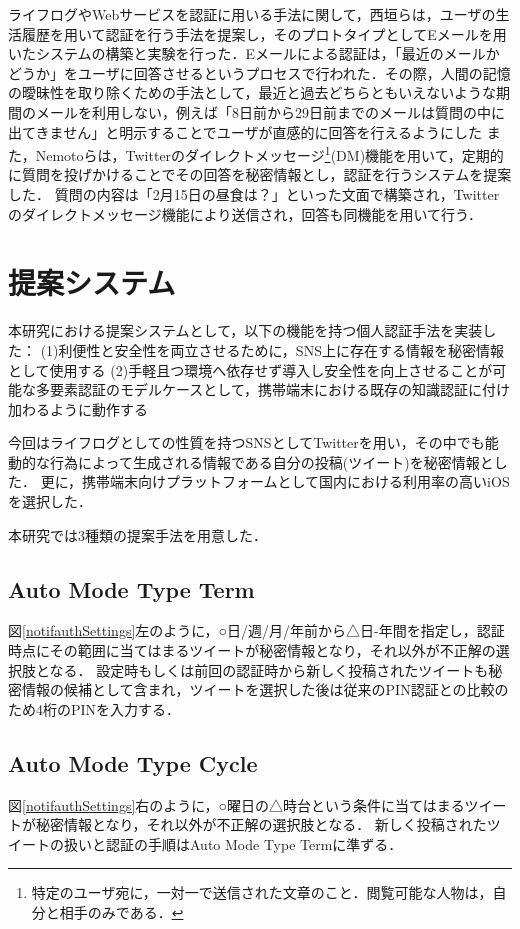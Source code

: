 \documentclass[twocolumn, a4paper, 9pt]{UECIEresume}
\begin{document}
ライフログやWebサービスを認証に用いる手法に関して，西垣ら\cite{西垣正勝:2006-03-15}は，ユーザの生活履歴を用いて認証を行う手法を提案し，そのプロトタイプとしてEメールを用いたシステムの構築と実験を行った．Eメールによる認証は，「最近のメールかどうか」をユーザに回答させるというプロセスで行われた．その際，人間の記憶の曖昧性を取り除くための手法として，最近と過去どちらともいえないような期間のメールを利用しない，例えば「8日前から29日前までのメールは質問の中に出てきません」と明示することでユーザが直感的に回答を行えるようにした
また，Nemotoら\cite{nemoto:2006-03-15}は，Twitterのダイレクトメッセージ\footnote{特定のユーザ宛に，一対一で送信された文章のこと．閲覧可能な人物は，自分と相手のみである．}(DM)機能を用いて，定期的に質問を投げかけることでその回答を秘密情報とし，認証を行うシステムを提案した．
質問の内容は「2月15日の昼食は？」といった文面で構築され，Twitterのダイレクトメッセージ機能により送信され，回答も同機能を用いて行う．

\section{提案システム}
本研究における提案システムとして，以下の機能を持つ個人認証手法を実装した：
(1)利便性と安全性を両立させるために，SNS上に存在する情報を秘密情報として使用する
(2)手軽且つ環境へ依存せず導入し安全性を向上させることが可能な多要素認証のモデルケースとして，携帯端末における既存の知識認証に付け加わるように動作する

今回はライフログとしての性質を持つSNSとしてTwitterを用い，その中でも能動的な行為によって生成される情報である自分の投稿(ツイート)を秘密情報とした．
更に，携帯端末向けプラットフォームとして国内における利用率の高いiOSを選択した．

本研究では3種類の提案手法を用意した．

\subsection{Auto Mode Type Term}
図\ref{notifauthSettings}左のように，○日/週/月/年前から△日-年間を指定し，認証時点にその範囲に当てはまるツイートが秘密情報となり，それ以外が不正解の選択肢となる．
設定時もしくは前回の認証時から新しく投稿されたツイートも秘密情報の候補として含まれ，ツイートを選択した後は従来のPIN認証との比較のため4桁のPINを入力する．

\subsection{Auto Mode Type Cycle}
図\ref{notifauthSettings}右のように，○曜日の△時台という条件に当てはまるツイートが秘密情報となり，それ以外が不正解の選択肢となる．
新しく投稿されたツイートの扱いと認証の手順はAuto Mode Type Termに準ずる．
\end{document}
